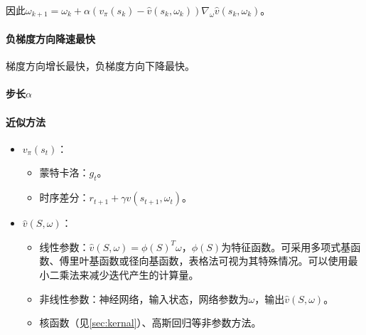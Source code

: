 \documentclass[
12pt, %
a4paper, 
oneside, %
headinclude,footinclude, %
]{scrartcl}
\begin{document}
因此$ \omega_{k + 1} = \omega_k + \alpha (v_\pi(s_k) - \hat{v}(s_k, \omega_k)) \nabla_\omega \hat{v}(s_k, \omega_k) $。
\paragraph{负梯度方向降速最快}
梯度方向增长最快，负梯度方向下降最快。
\paragraph{步长$ \alpha $}
\paragraph{近似方法}\label{sec:kernal back}
\begin{itemize}
\item $ v_\pi(s_t) $：
\begin{itemize}
\item 蒙特卡洛：$ g_t $。
\item 时序差分：$ r_{t + 1} + \gamma \hat{v}(s_{t + 1}, \omega_t) $。
\end{itemize}
\item $ \hat{v}(S, \omega) $：
\begin{itemize}
\item 线性参数：$ \hat{v}(S, \omega) = \phi(S)^T \omega $，$ \phi(S) $为特征函数。可采用多项式基函数、傅里叶基函数或径向基函数，表格法可视为其特殊情况。可以使用最小二乘法来减少迭代产生的计算量。
\item 非线性参数：神经网络，输入状态，网络参数为$ \omega $，输出$ \hat{v}(S, \omega) $。
\item 核函数（见\ref{sec:kernal}）、高斯回归等非参数方法。
\end{itemize}
\end{itemize}
\end{document}
